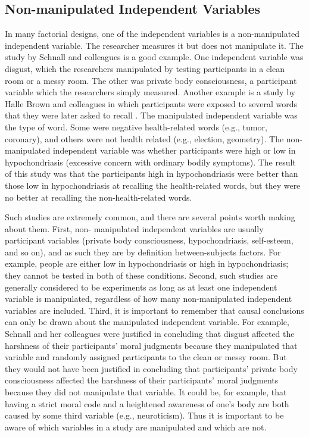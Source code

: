 \subsection{Non-manipulated Independent Variables}

In many factorial designs, one of the independent variables is a non-manipulated independent variable. The researcher measures it but does not manipulate it. The study by Schnall and colleagues is a good example. One independent variable was disgust, which the researchers manipulated by testing participants in a clean room or a messy room. The other was private body consciousness, a participant variable which the researchers simply measured. Another example is a study by Halle Brown and colleagues in which participants were exposed to several words that they were later asked to recall \citep{brown_perceptual_1999}. The manipulated independent variable was the type of word. Some were negative health-related words (e.g., tumor, coronary), and others were not health related (e.g., election, geometry). The non-manipulated independent variable was whether participants were high or low in hypochondriasis (excessive concern with ordinary bodily symptoms). The result of this study was that the participants high in hypochondriasis were better than those low in hypochondriasis at recalling the health-related words, but they were no better at recalling the non-health-related words.

Such studies are extremely common, and there are several points worth making about them. First, non- manipulated independent variables are usually participant variables (private body consciousness, hypochondriasis, self-esteem, and so on), and as such they are by definition between-subjects factors. For example, people are either low in hypochondriasis or high in hypochondriasis; they cannot be tested in both of these conditions. Second, such studies are generally considered to be experiments as long as at least one independent variable is manipulated, regardless of how many non-manipulated independent variables are included. Third, it is important to remember that causal conclusions can only be drawn about the manipulated independent variable. For example, Schnall and her colleagues were justified in concluding that disgust affected the harshness of their participants' moral judgments because they manipulated that variable and randomly assigned participants to the clean or messy room. But they would not have been justified in concluding that participants' private body consciousness affected the harshness of their participants' moral judgments because they did not manipulate that variable. It could be, for example, that having a strict moral code and a heightened awareness of one's body are both caused by some third variable (e.g., neuroticism). Thus it is important to be aware of which variables in a study are manipulated and which are not.

